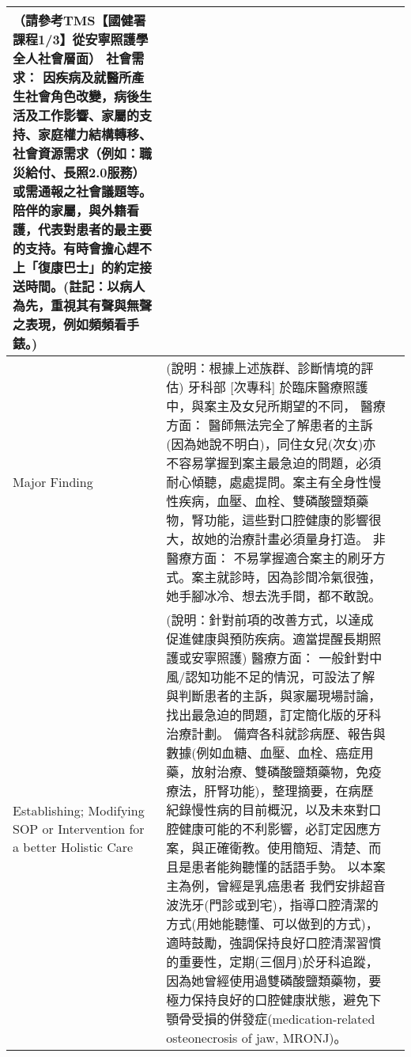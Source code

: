 \documentclass[12pt, a4paper]{article}
\begin{document}
\begin{xltabular}{1.0\linewidth}[c]{|p{2.3cm}|p{12.4cm}|l|}
  {\color[HTML]{C0C0C0}（請參考TMS【國健署課程1/3】從安寧照護學全人社會層面）}\newline 
  社會需求：
   因疾病及就醫所產生社會角色改變，病後生活及工作影響、家屬的支持、家庭權力結構轉移、社會資源需求（例如：職災給付、長照2.0服務）或需通報之社會議題等。 陪伴的家屬，與外籍看護，代表對患者的最主要的支持。有時會擔心趕不上「復康巴士」的約定接送時間。{\color[HTML]{C0C0C0}(註記：以病人為先，重視其有聲與無聲之表現，例如頻頻看手錶。) } &
   \\ \hline
Major Finding &
  {\color[HTML]{C0C0C0}(說明：根據上述族群、診斷情境的評估)}\newline 
   牙科部 [次專科] 於臨床醫療照護中，與案主及女兒所期望的不同，\newline 
   醫療方面： 醫師無法完全了解患者的主訴(因為她說不明白)，同住女兒(次女)亦不容易掌握到案主最急迫的問題，必須耐心傾聽，處處提問。案主有全身性慢性疾病，血壓、血栓、雙磷酸鹽類藥物，腎功能，這些對口腔健康的影響很大，故她的治療計畫必須量身打造。\newline 
   非醫療方面： 不易掌握適合案主的刷牙方式。案主就診時，因為診間冷氣很強，她手腳冰冷、想去洗手間，都不敢說。 &
   \\ \hline
Establishing; Modifying SOP or Intervention for a better Holistic Care &
  {\color[HTML]{C0C0C0}(說明：針對前項的改善方式，以達成促進健康與預防疾病。適當提醒長期照護或安寧照護)} \newline 
  醫療方面： 一般針對中風/認知功能不足的情況，可設法了解與判斷患者的主訴，與家屬現場討論，找出最急迫的問題，訂定簡化版的牙科治療計劃。 備齊各科就診病歷、報告與數據(例如血糖、血壓、血栓、癌症用藥，放射治療、雙磷酸鹽類藥物，免疫療法，肝腎功能)，整理摘要，在病歷紀錄慢性病的目前概況，以及未來對口腔健康可能的不利影響，必訂定因應方案，與正確衛教。使用簡短、清楚、而且是患者能夠聽懂的話語手勢。\newline 
   以本案主為例，曾經是乳癌患者
   我們安排超音波洗牙(門診或到宅)，指導口腔清潔的方式(用她能聽懂、可以做到的方式)，適時鼓勵，強調保持良好口腔清潔習慣的重要性，定期(三個月)於牙科追蹤，因為她曾經使用過雙磷酸鹽類藥物，要極力保持良好的口腔健康狀態，避免下顎骨受損的併發症(medication-related osteonecrosis of jaw, MRONJ)。\newline 

\end{xltabular}
\end{document}
